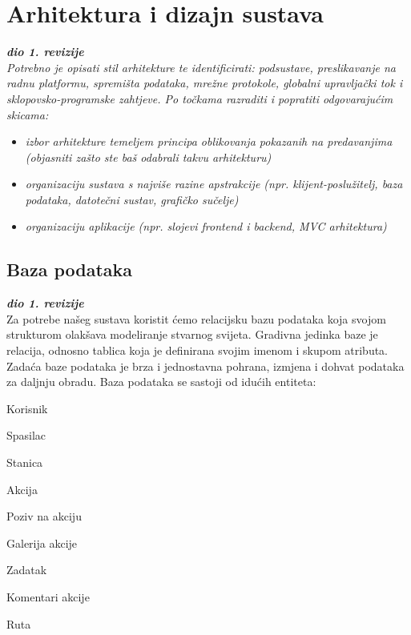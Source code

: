 \chapter{Arhitektura i dizajn sustava}
		
		\textbf{\textit{dio 1. revizije}}\\

		\textit{ Potrebno je opisati stil arhitekture te identificirati: podsustave, preslikavanje na radnu platformu, spremišta podataka, mrežne protokole, globalni upravljački tok i sklopovsko-programske zahtjeve. Po točkama razraditi i popratiti odgovarajućim skicama:}
	\begin{itemize}
		\item 	\textit{izbor arhitekture temeljem principa oblikovanja pokazanih na predavanjima (objasniti zašto ste baš odabrali takvu arhitekturu)}
		\item 	\textit{organizaciju sustava s najviše razine apstrakcije (npr. klijent-poslužitelj, baza podataka, datotečni sustav, grafičko sučelje)}
		\item 	\textit{organizaciju aplikacije (npr. slojevi frontend i backend, MVC arhitektura) }		
	\end{itemize}

	
		

		

				
		\section{Baza podataka}
			
			\textbf{\textit{dio 1. revizije}}\\
			
		\text Za potrebe našeg sustava koristit ćemo relacijsku bazu podataka koja svojom strukturom olakšava modeliranje stvarnog svijeta. Gradivna jedinka baze je relacija, odnosno tablica koja je definirana svojim imenom i skupom atributa. Zadaća baze podataka je brza i jednostavna pohrana, izmjena i dohvat podataka za daljnju obradu.
		\text Baza podataka se sastoji od idućih entiteta:
		\begin{packed_item}
			
			\item Korisnik
			\item Spasilac
			\item Stanica
			\item Akcija
			\item Poziv na akciju
			\item Galerija akcije
			\item Zadatak
			\item Komentari akcije
			\item Ruta

		\end{packed_item}
		
